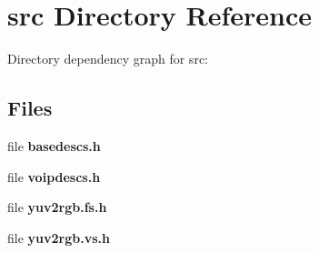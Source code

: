 \section{src Directory Reference}
\label{dir_68267d1309a1af8e8297ef4c3efbcdba}
Directory dependency graph for src\-:
\subsection*{Files}
\begin{DoxyCompactItemize}
\item 
file {\bfseries basedescs.\-h}
\item 
file {\bfseries voipdescs.\-h}
\item 
file {\bfseries yuv2rgb.\-fs.\-h}
\item 
file {\bfseries yuv2rgb.\-vs.\-h}
\end{DoxyCompactItemize}
